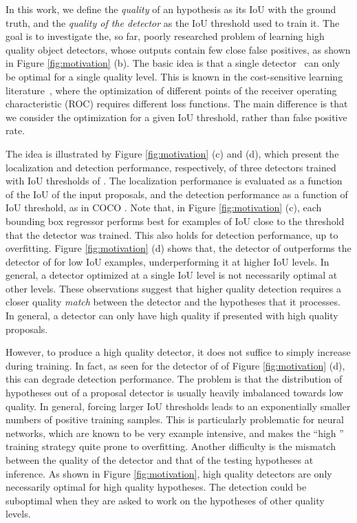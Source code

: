 \documentclass[10pt,twocolumn,letterpaper]{article}
\begin{document}
In this work, we define the {\it quality\/} of an hypothesis as its IoU with
the ground truth, and the {\it quality of the detector\/} as the IoU threshold
 used to train it. The goal is to investigate the, so far, poorly
researched problem of learning high quality object detectors,
whose outputs contain few close false positives, as shown in
Figure \ref{fig:motivation} (b). The basic idea is that a single detector \
can only be optimal for a single quality level. This is known in the
cost-sensitive learning literature~\cite{DBLP:conf/ijcai/Elkan01,
DBLP:journals/pami/Masnadi-ShiraziV11}, where the optimization of
different points of the receiver operating characteristic (ROC) requires
different loss functions. The main difference is that we consider
the optimization for a given IoU threshold, rather than false positive rate.

The idea is illustrated by Figure \ref{fig:motivation} (c) and (d), which
present the localization and detection performance, respectively, of
three detectors trained with IoU thresholds of . The
localization performance is evaluated
as a function of the IoU of the input proposals, and the detection
performance as a function of IoU threshold, as in
COCO \cite{DBLP:conf/eccv/LinMBHPRDZ14}. Note that, in
Figure \ref{fig:motivation} (c), each bounding box regressor performs
best for examples of IoU close to the threshold that the detector
was trained. This also holds for detection performance, up to overfitting.
Figure \ref{fig:motivation} (d) shows that, the detector of 
outperforms the detector of  for low IoU examples, underperforming
it at higher IoU levels. In general, a detector optimized at a single IoU
level is not necessarily optimal at other levels.
These observations suggest that higher quality detection requires a
closer quality {\it match\/} between the detector and the
hypotheses that it processes. In general, a detector can only
have high quality if presented with high quality proposals.

However, to produce a high quality detector, it does not suffice to
simply increase  during training. In fact, as seen for the detector
of  of Figure \ref{fig:motivation} (d), this can degrade detection
performance. The problem is that the distribution of hypotheses
out of a proposal detector is usually heavily imbalanced towards low
quality. In general, forcing larger IoU thresholds leads to an
exponentially smaller numbers of positive training samples. This is
particularly problematic for neural networks, which are known to be very
example intensive, and makes the ``high '' training strategy
quite prone to overfitting. Another difficulty is the
mismatch between the quality of the detector and that of the testing
hypotheses at inference. As shown in Figure \ref{fig:motivation},
high quality detectors are only necessarily optimal for high quality
hypotheses. The detection could be suboptimal when they are asked to work
on the hypotheses of other quality levels.
\end{document}
